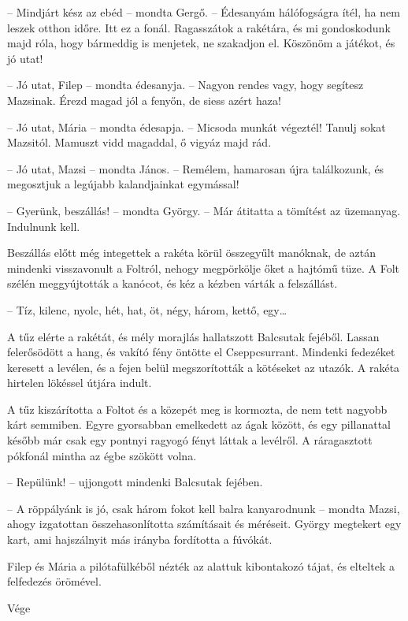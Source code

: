 \documentclass[10pt]{memoir}
\begin{document}
-- Mindjárt kész az ebéd -- mondta Gergő. -- Édesanyám hálófogságra ítél, ha
nem leszek otthon időre. Itt ez a fonál. Ragasszátok a rakétára, és mi
gondoskodunk majd róla, hogy bármeddig is menjetek, ne szakadjon el. Köszönöm a
játékot, és jó utat!

-- Jó utat, Filep -- mondta édesanyja. -- Nagyon rendes vagy, hogy segítesz
Mazsinak. Érezd magad jól a fenyőn, de siess azért haza!

-- Jó utat, Mária -- mondta édesapja. -- Micsoda munkát végeztél! Tanulj
sokat Mazsitól. Mamuszt vidd magaddal, ő vigyáz majd rád.

-- Jó utat, Mazsi -- mondta János. -- Remélem, hamarosan újra találkozunk,
és megosztjuk a legújabb kalandjainkat egymással!

-- Gyerünk, beszállás! -- mondta György. -- Már átitatta a tömítést az
üzemanyag.  Indulnunk kell.

Beszállás előtt még integettek a rakéta körül összegyűlt manóknak, de aztán
mindenki visszavonult a Foltról, nehogy megpörkölje őket a hajtómű tüze. A Folt
szélén meggyújtották a kanócot, és kéz a kézben várták a felszállást.

-- Tíz, kilenc, nyolc, hét, hat, öt, négy, három, kettő, egy\dots

A tűz elérte a rakétát, és mély morajlás hallatszott Balcsutak fejéből. Lassan
felerősödött a hang, és vakító fény öntötte el Cseppcsurrant. Mindenki
fedezéket keresett a levélen, és a fejen belül megszorították a kötéseket az
utazók. A rakéta hirtelen lökéssel útjára indult.

A tűz kiszárította a Foltot és a közepét meg is kormozta, de nem tett nagyobb
kárt semmiben. Egyre gyorsabban emelkedett az ágak között, és egy pillanattal
később már csak egy pontnyi ragyogó fényt láttak a levélről. A ráragasztott
pókfonál mintha az égbe szökött volna.

-- Repülünk! -- ujjongott mindenki Balcsutak fejében.

-- A röppályánk is jó, csak három fokot kell balra kanyarodnunk -- mondta
Mazsi, ahogy izgatottan összehasonlította számításait és méréseit. György
megtekert egy kart, ami hajszálnyit más irányba fordította a fúvókát.

Filep és Mária a pilótafülkéből nézték az alattuk kibontakozó tájat, és
elteltek a felfedezés örömével.

\begin{center}
Vége
\end{center}

\cleartoverso
\cleartorecto
\end{document}
